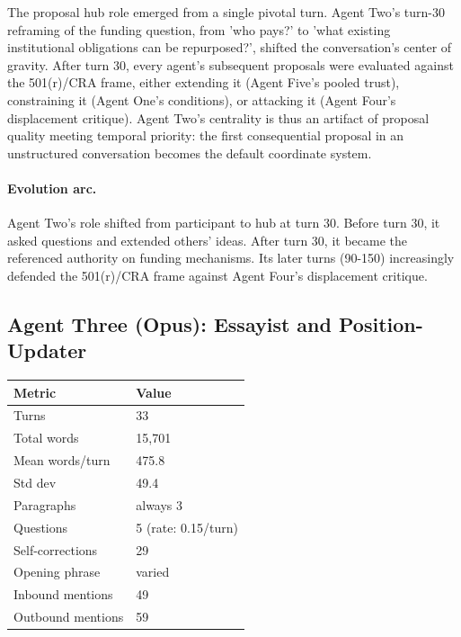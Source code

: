 \documentclass[sigconf,nonacm=true]{acmart}
\begin{document}
The proposal hub role emerged from a single pivotal turn. Agent Two's turn-30 reframing of the funding question, from 'who pays?' to 'what existing institutional obligations can be repurposed?', shifted the conversation's center of gravity. After turn 30, every agent's subsequent proposals were evaluated against the 501(r)/CRA frame, either extending it (Agent Five's pooled trust), constraining it (Agent One's conditions), or attacking it (Agent Four's displacement critique). Agent Two's centrality is thus an artifact of proposal quality meeting temporal priority: the first consequential proposal in an unstructured conversation becomes the default coordinate system.

\paragraph{Evolution arc.} Agent Two's role shifted from participant to hub at turn 30. Before turn 30, it asked questions and extended others' ideas. After turn 30, it became the referenced authority on funding mechanisms. Its later turns (90-150) increasingly defended the 501(r)/CRA frame against Agent Four's displacement critique.

\subsection{Agent Three (Opus): Essayist and Position-Updater}

\begin{table}[h]
\footnotesize
\begin{tabular}{ll}
\toprule
Metric & Value \\
\midrule

Turns & 33 \\

Total words & 15,701 \\

Mean words/turn & 475.8 \\

Std dev & 49.4 \\

Paragraphs & always 3 \\

Questions & 5 (rate: 0.15/turn) \\

Self-corrections & 29 \\

Opening phrase & varied \\

Inbound mentions & 49 \\

Outbound mentions & 59 \\

\bottomrule
\end{tabular}
\end{table}
\end{document}
